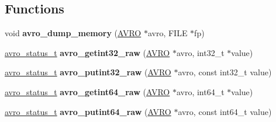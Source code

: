 \subsection*{Functions}
\begin{CompactItemize}
\item 
\hypertarget{group___a_v_r_o_ge6f2feafe06746f9f48d3d1ee186d173}{
void \textbf{avro\_\-dump\_\-memory} (\hyperlink{struct_a_v_r_o}{AVRO} $\ast$avro, FILE $\ast$fp)}
\label{group___a_v_r_o_ge6f2feafe06746f9f48d3d1ee186d173}

\item 
\hypertarget{group___a_v_r_o_ga164f39fde7378d15bcbf5ae68bde902}{
\hyperlink{group___handle___routines_g4271ca78aabaaad628d7b632aa5a1499}{avro\_\-status\_\-t} \textbf{avro\_\-getint32\_\-raw} (\hyperlink{struct_a_v_r_o}{AVRO} $\ast$avro, int32\_\-t $\ast$value)}
\label{group___a_v_r_o_ga164f39fde7378d15bcbf5ae68bde902}

\item 
\hypertarget{group___a_v_r_o_gf3117aff45720e3a226e5101b7067bc8}{
\hyperlink{group___handle___routines_g4271ca78aabaaad628d7b632aa5a1499}{avro\_\-status\_\-t} \textbf{avro\_\-putint32\_\-raw} (\hyperlink{struct_a_v_r_o}{AVRO} $\ast$avro, const int32\_\-t value)}
\label{group___a_v_r_o_gf3117aff45720e3a226e5101b7067bc8}

\item 
\hypertarget{group___a_v_r_o_g23be6d2c7a1e1adec170cd0a35c44b96}{
\hyperlink{group___handle___routines_g4271ca78aabaaad628d7b632aa5a1499}{avro\_\-status\_\-t} \textbf{avro\_\-getint64\_\-raw} (\hyperlink{struct_a_v_r_o}{AVRO} $\ast$avro, int64\_\-t $\ast$value)}
\label{group___a_v_r_o_g23be6d2c7a1e1adec170cd0a35c44b96}

\item 
\hypertarget{group___a_v_r_o_g233761be573e51ca3fa393ff6d7dea04}{
\hyperlink{group___handle___routines_g4271ca78aabaaad628d7b632aa5a1499}{avro\_\-status\_\-t} \textbf{avro\_\-putint64\_\-raw} (\hyperlink{struct_a_v_r_o}{AVRO} $\ast$avro, const int64\_\-t value)}
\label{group___a_v_r_o_g233761be573e51ca3fa393ff6d7dea04}

\end{CompactItemize}
